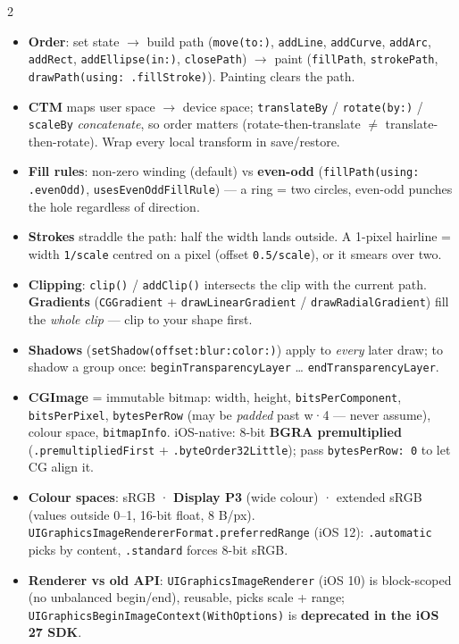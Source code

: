 \documentclass[8pt]{extarticle}
\newcommand\ct[1]{\texttt{#1}}
\newcommand\hd[1]{\par\vspace{3pt}\noindent{\bfseries\color{sheetBlue}#1}\par\vspace{1pt}}
\begin{document}
\begin{multicols}{2}
\raggedright{}

\hd{How it works}
\begin{itemize}
  \item \textbf{Order}: set state $\to$ build path (\ct{move(to:)}, \ct{addLine}, \ct{addCurve},
        \ct{addArc}, \ct{addRect}, \ct{addEllipse(in:)}, \ct{closePath}) $\to$ paint
        (\ct{fillPath}, \ct{strokePath}, \ct{drawPath(using: .fillStroke)}). Painting clears the path.
  \item \textbf{CTM} maps user space $\to$ device space; \ct{translateBy} / \ct{rotate(by:)} /
        \ct{scaleBy} \emph{concatenate}, so order matters (rotate-then-translate $\neq$
        translate-then-rotate). Wrap every local transform in save/restore.
  \item \textbf{Fill rules}: non-zero winding (default) vs \textbf{even-odd}
        (\ct{fillPath(using: .evenOdd)}, \ct{usesEvenOddFillRule}) — a ring = two circles,
        even-odd punches the hole regardless of direction.
  \item \textbf{Strokes} straddle the path: half the width lands outside. A 1-pixel hairline =
        width \ct{1/scale} centred on a pixel (offset \ct{0.5/scale}), or it smears over two.
  \item \textbf{Clipping}: \ct{clip()} / \ct{addClip()} intersects the clip with the current path.
        \textbf{Gradients} (\ct{CGGradient} + \ct{drawLinearGradient} / \ct{drawRadialGradient})
        fill the \emph{whole clip} — clip to your shape first.
  \item \textbf{Shadows} (\ct{setShadow(offset:blur:color:)}) apply to \emph{every} later draw;
        to shadow a group once: \ct{beginTransparencyLayer} … \ct{endTransparencyLayer}.
  \item \textbf{CGImage} = immutable bitmap: width, height, \ct{bitsPerComponent},
        \ct{bitsPerPixel}, \ct{bytesPerRow} (may be \emph{padded} past w·4 — never assume),
        colour space, \ct{bitmapInfo}. iOS-native: 8-bit \textbf{BGRA premultiplied}
        (\ct{.premultipliedFirst} + \ct{.byteOrder32Little}); pass \ct{bytesPerRow: 0} to let
        CG align it.
  \item \textbf{Colour spaces}: sRGB · \textbf{Display P3} (wide colour) · extended sRGB (values
        outside 0–1, 16-bit float, 8 B/px). \ct{UIGraphicsImageRendererFormat.preferredRange}
        (iOS 12): \ct{.automatic} picks by content, \ct{.standard} forces 8-bit sRGB.
  \item \textbf{Renderer vs old API}: \ct{UIGraphicsImageRenderer} (iOS 10) is block-scoped (no
        unbalanced begin/end), reusable, picks scale + range; \ct{UIGraphicsBeginImageContext(WithOptions)}
        is \textbf{deprecated in the iOS 27 SDK}.
\end{itemize}


\end{multicols}
\end{document}
